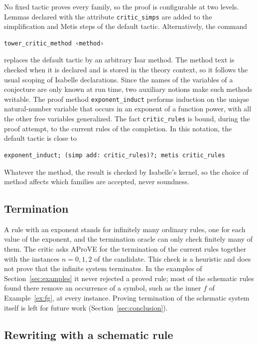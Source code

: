 \documentclass[preprint,12pt]{elsarticle}
\newcommand{\isa}[1]{\texttt{#1}}
\begin{document}
No fixed tactic proves every family, so the proof is configurable at two
levels. Lemmas declared with the attribute \isa{critic\_simps} are added
to the simplification and Metis steps of the default tactic. Alternatively,
the command
\begin{lstlisting}
tower_critic_method ‹method›
\end{lstlisting}
replaces the default tactic by an arbitrary Isar method. The method text
is checked when it is declared and is stored in the theory context, so it
follows the usual scoping of Isabelle declarations. Since the names of the
variables of a conjecture are only known at run time, two auxiliary
notions make such methods writable. The proof method \isa{exponent\_induct}
performs induction on the unique natural-number variable that occurs in an
exponent of a function power, with all the other free variables
generalized. The fact \isa{critic\_rules} is bound, during the proof
attempt, to the current rules of the completion. In this notation, the
default tactic is close to
\begin{lstlisting}
exponent_induct; (simp add: critic_rules)?; metis critic_rules
\end{lstlisting}
Whatever the method, the result is checked by Isabelle's kernel, so the
choice of method affects which families are accepted, never soundness.

\subsection{Termination}

A rule with an exponent stands for infinitely many ordinary rules, one for
each value of the exponent, and the termination oracle can only check
finitely many of them. The critic
asks AProVE for the termination of the current rules together with the
instances $n = 0, 1, 2$ of the candidate. This check is a heuristic and
does not prove that the infinite system terminates. In the examples of
Section~\ref{sec:examples} it never rejected a proved rule; most of the
schematic rules found there remove an occurrence of a symbol, such as the
inner $f$ of Example~\ref{ex:fg}, at every instance. Proving termination of
the schematic system itself is left for future work
(Section~\ref{sec:conclusion}).

\subsection{Rewriting with a schematic rule}
\end{document}
